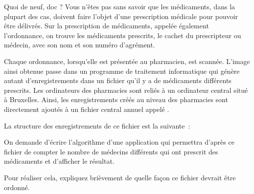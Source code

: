 \begin{Exercice}{Quoi de neuf, doc ?}
	Vous n’êtes pas sans savoir que les médicaments, dans la plupart des
	cas, doivent faire l’objet d’une prescription médicale pour pouvoir
	être délivrés. Sur la prescription de médicaments, appelée également
	l’ordonnance, on trouve les médicaments prescrits, le cachet du
	prescripteur ou médecin, avec son nom et son numéro d’agrément.

	Chaque ordonnance, lorsqu’elle est présentée au pharmacien, est scannée.
	L’image ainsi obtenue passe dans un programme de traitement
	informatique qui génère autant d’enregistrements dans un fichier qu’il
	y a de médicaments différents prescrits. Les ordinateurs des pharmacies
	sont reliés à un ordinateur central situé à Bruxelles. Ainsi, les
	enregistrements créés au niveau des pharmacies sont directement ajoutés
	à un fichier central annuel appelé . 

	La structure  des enregistrements de ce fichier est
	la suivante~:


	On demande d’écrire l’algorithme d’une application qui permettra d’après
	ce fichier de compter le nombre de médecins différents qui ont prescrit
	des médicaments et d’afficher le résultat.

	Pour réaliser cela, expliquez brièvement de quelle façon ce fichier
	devrait être ordonné.
\end{Exercice}

